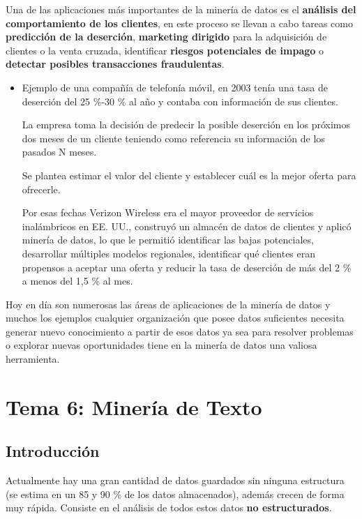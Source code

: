 \documentclass[12pt, twoside, openright]{report} %
\begin{document}
Una de las aplicaciones más importantes de la minería de datos es el \textbf{análisis del comportamiento de los clientes}, en este proceso se llevan a cabo tareas como \textbf{predicción de la deserción}, \textbf{marketing dirigido} para la adquisición de clientes o la venta cruzada, identificar \textbf{riesgos potenciales de impago} o \textbf{detectar posibles transacciones fraudulentas}.
\begin{itemize}
	\item Ejemplo de una compañía de telefonía móvil, en 2003 tenía una tasa de deserción del 25 \%-30 \% al año y contaba con información de sus clientes.

	      La empresa toma la decisión de predecir la posible deserción en los próximos dos meses de un cliente teniendo como referencia su información de los pasados N meses.

	      Se plantea estimar el valor del cliente y establecer cuál es la mejor oferta para ofrecerle.

	      Por esas fechas Verizon Wireless era el mayor proveedor de servicios inalámbricos en EE. UU., construyó un almacén de datos de clientes y aplicó minería de datos, lo que le permitió identificar las bajas potenciales, desarrollar múltiples modelos regionales, identificar qué clientes eran propensos a aceptar una oferta y reducir la tasa de deserción de más del 2 \% a menos del 1,5 \% al mes.
\end{itemize}

Hoy en día son numerosas las áreas de aplicaciones de la minería de datos y muchos los ejemplos cualquier organización que posee datos suficientes necesita generar nuevo conocimiento a partir de esos datos ya sea para resolver problemas o explorar nuevas oportunidades tiene en la minería de datos una valiosa herramienta.

\chapter{Tema 6: Minería de Texto}
\section{Introducción}
Actualmente hay una gran cantidad de datos guardados sin ninguna estructura (se estima en un 85 y 90 \% de los datos almacenados), además crecen de forma muy rápida. Consiste en el análisis de todos estos datos \textbf{no estructurados}. 
\end{document}
